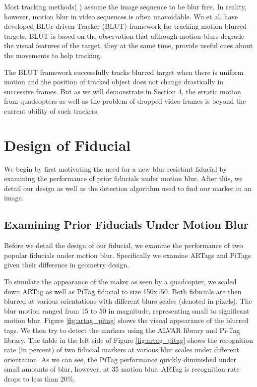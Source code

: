 \documentclass[runningheads]{llncs}
\begin{document}
Most tracking methods( \cite{Ross:2008,Wu:2009,Perez02,Mei:2009} ) assume the
image sequence to be blur free. In reality, however, motion blur in video
sequences is often unavoidable. Wu et al.\cite{Wu:2011} have developed
BLUr-driven Tracker (BLUT) framework for tracking motion-blurred targets. BLUT
is based on the observation that although motion blurs degrade the visual
features of the target, they at the same time, provide useful cues about the
movements to help tracking.

The BLUT framework successfully tracks blurred target when there is uniform motion
and the position of tracked object does not change drastically in successive
frames. But as we will demonstrate in Section 4, the erratic motion from quadcopters as 
well as the problem of dropped video frames is beyond the current ability of such trackers.

\section{Design of Fiducial}

We begin by first motivating the need for a new blur resistant fiducial by examining
the performance of prior fiducials under motion blur.  After this, we detail
our design as well as the detection algorithm used to find our marker in an image.

\subsection{Examining Prior Fiducials Under Motion Blur}

Before we detail the design of our fiducial, we examine the performance of two
popular fiducials under motion blur.  Specifically we examine ARTags
\cite{Fiala05} and PiTags\cite{Pitag13} given their difference in geometry design.

To simulate the appearance of the maker as seen by a quadcopter,  we scaled down
ARTag as well as PiTag fiducial to size 150x150. Both fiducials are then blurred
at various orientations with different blurs scales (denoted in pixels).   The
blur motion ranged from 15 to 50 in magnitude, representing small to significant
motion blur. Figure \ref{fig:artag_pitag} shows the visual appearance of the
blurred tags. We then try to detect the markers using the ALVAR
library\cite{alvar} and Pi-Tag library\cite{ros_pitag}.
The table in the left side of Figure
\ref{fig:artag_pitag} shows the recognition rate (in percent) of two fiducial
markers at various blur scales under different orientation.   As we can see,
the PiTag performance quickly diminished under small amounts of blur, however,
at 35 motion blur, ARTag is recognition rate drops to less than 20\%.
\end{document}
